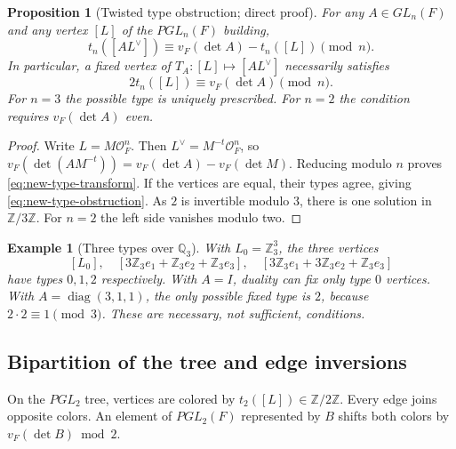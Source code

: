 \documentclass[12pt,letterpaper]{amsart}
\numberwithin{equation}{section}
\newtheorem{proposition}[theorem]{Proposition}
\newtheorem{example}[theorem]{Example}
\theoremstyle{definition}
\theoremstyle{plain}
\begin{document}
\begin{proposition}[Twisted type obstruction; direct proof]
\label{prop:new-type}
For any $A\in GL_n(F)$ and any vertex $[L]$ of the
$PGL_n(F)$ building,
\begin{equation}\label{eq:new-type-transform}
 t_n([A L^\vee])\equiv v_F(\det A)-t_n([L])\pmod n.
\end{equation}
In particular, a fixed vertex of $T_A:[L]\mapsto[A L^\vee]$
necessarily satisfies
\begin{equation}\label{eq:new-type-obstruction}
 2t_n([L])\equiv v_F(\det A)\pmod n.
\end{equation}
For $n=3$ the possible type is uniquely prescribed. For $n=2$
the condition requires $v_F(\det A)$ even.
\end{proposition}
\begin{proof}
Write $L=M\mathcal O_F^n$. Then
$L^\vee=M^{-t}\mathcal O_F^n$, so
$v_F(\det(AM^{-t}))=v_F(\det A)-v_F(\det M)$.
Reducing modulo $n$ proves \eqref{eq:new-type-transform}. If the
vertices are equal, their types agree, giving
\eqref{eq:new-type-obstruction}. As $2$ is invertible modulo $3$,
there is one solution in $\mathbb Z/3\mathbb Z$.
For $n=2$ the left side vanishes modulo two.
\end{proof}

\begin{example}[Three types over $\mathbb Q_3$]
With $L_0=\mathbb Z_3^3$, the three vertices
\[
 [L_0],\quad
 [3\mathbb Z_3e_1+\mathbb Z_3e_2+\mathbb Z_3e_3],\quad
 [3\mathbb Z_3e_1+3\mathbb Z_3e_2+\mathbb Z_3e_3]
\]
have types $0,1,2$ respectively. With $A=I$, duality can fix only
type $0$ vertices. With $A=\operatorname{diag}(3,1,1)$, the only
possible fixed type is $2$, because $2\cdot2\equiv1\pmod3$.
These are necessary, not sufficient, conditions.
\end{example}

\subsection{Bipartition of the tree and edge inversions}
On the $PGL_2$ tree, vertices are colored by
$t_2([L])\in\mathbb Z/2\mathbb Z$. Every edge joins opposite colors.
An element of $PGL_2(F)$ represented by $B$ shifts both colors by
$v_F(\det B)\bmod2$.
\end{document}
